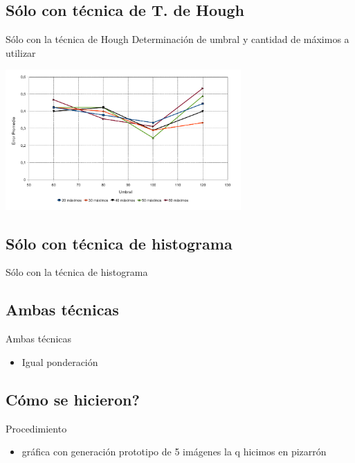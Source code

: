 \documentclass[spanish]{beamer}
\begin{document}
\subsection{Sólo con técnica de T. de Hough}
\begin{frame}{Sólo con la técnica de Hough}
Determinación de umbral y cantidad de máximos a utilizar
  \begin{center}\includegraphics[width=9cm]{../diagramas/estadistica_noche_iguales} \end{center}
\end{frame}

\subsection{Sólo con técnica de histograma}
\begin{frame}{Sólo con la técnica de histograma}
\end{frame}

\subsection{Ambas técnicas}
\begin{frame}{Ambas técnicas}
  \begin{itemize}
  \item Igual ponderación
  \end{itemize}
\end{frame}

\subsection{Cómo se hicieron?}
\begin{frame}{Procedimiento}
  \begin{itemize}
  \item gráfica con generación prototipo de 5 imágenes la q hicimos en pizarrón
  \end{itemize}
\end{frame}
\end{document}
